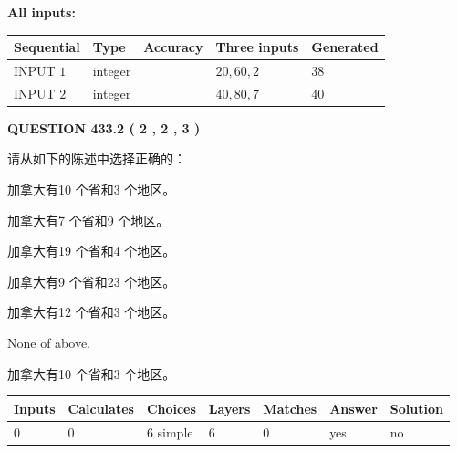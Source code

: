 \documentclass{ctexart}
\begin{document}
   
   
   
\noindent\vspace{0.1in}\hspace{-0.08in} {\textbf{\Large{All inputs: }}}
   
   
  
  
\noindent\begin{tabular}{|l|l|l|l|l|}
\hline
 Sequential & Type & Accuracy & Three inputs & Generated \\ 
\hline
 
 
  INPUT $  1 $ & integer &  & $
 20
 , 
 60
 , 
 2
 $ & $ 38 $ 
 \\  \hline  
 
 
  INPUT $  2 $ & integer &  & $
 40
 , 
 80
 , 
 7
 $ & $ 40 $ 
 \\  \hline  
 \end{tabular}
   
   
  
\vspace{0.2in}
  
{\textbf{\Large{QUESTION
433.2 
 ( 2 , 2 , 3 )
}}}
  
  
请从如下的陈述中选择正确的：
 
 
加拿大有10 个省和3 个地区。
 
 
加拿大有7 个省和9 个地区。
 
 
加拿大有19 个省和4 个地区。
 
 
加拿大有9 个省和23 个地区。
 
 
加拿大有12 个省和3 个地区。
 
 
 None of above.
 
 
\noindent{}
 
 
加拿大有10 个省和3 个地区。
 
 
\noindent{}
 
 
   
   
   
   
\noindent\begin{tabular}{|l|l|l|l|l|l|l|}
 \hline
Inputs & Calculates & Choices & Layers & Matches & Answer & Solution \\ \hline
 0  & 
 0  & 
 6
  simple  
  & 
 6  & 
 0  & 
  yes & 
  no 
  \\ \hline
 \end{tabular}
   
\end{document}
